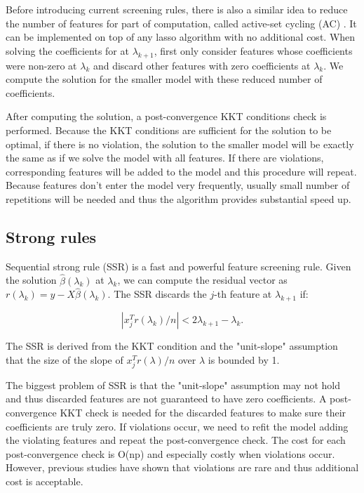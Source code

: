 Before introducing current screening rules, there is also a similar idea to reduce the number of features for part of computation, called active-set cycling (AC) \citep{lee2007efficient}. It can be implemented on top of any lasso algorithm with no additional cost. When solving the coefficients for at $\lambda_{k+1}$, first only consider features whose coefficients were non-zero at $\lambda_k$ and discard other features with zero coefficients at $\lambda_k$. We compute the solution for the smaller model with these reduced number of coefficients.

After computing the solution, a post-convergence KKT conditions check is performed. Because the KKT conditions are sufficient for the solution to be optimal, if there is no violation, the solution to the smaller model will be exactly the same as if we solve the model with all features. If there are violations, corresponding features will be added to the model and this procedure will repeat. Because features don't enter the model very frequently, usually small number of repetitions will be needed and thus the algorithm provides substantial speed up.

\subsection{Strong rules}

Sequential strong rule (SSR) \citep{tibshirani2011regression} is a fast and powerful feature screening rule. Given the solution $\hat{\beta}(\lambda_k)$ at $\lambda_k$, we can compute the residual vector as $r(\lambda_k)=y-X\hat{\beta}(\lambda_k)$. The SSR discards the $j$-th feature at $\lambda_{k+1}$ if:

\begin{equation}
    |x_j^Tr(\lambda_k)/n|<2\lambda_{k+1}-\lambda_k.
\end{equation}

The SSR is derived from the KKT condition and the "unit-slope" assumption that the size of the slope of $x_j^Tr(\lambda)/n$ over $\lambda$ is bounded by 1. 

The biggest problem of SSR is that the "unit-slope" assumption may not hold and thus discarded features are not guaranteed to have zero coefficients. A post-convergence KKT check is needed for the discarded features to make sure their coefficients are truly zero. If violations occur, we need to refit the model adding the violating features and repeat the post-convergence check. The cost for each post-convergence check is O(np) and especially costly when violations occur. However, previous studies have shown that violations are rare and thus additional cost is acceptable.

